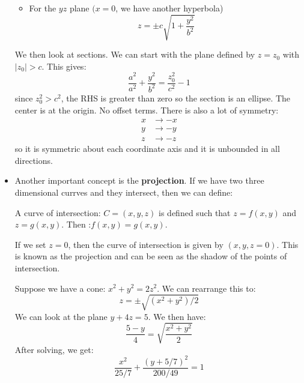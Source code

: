\begin{itemize}
\begin{example}
\begin{itemize}
            \item For the $yz$ plane $(x=0$, we have another hyperbola)
            \begin{equation}
                z = \pm c\sqrt{1+\frac{y^2}{b^2}}
            \end{equation}
        \end{itemize}
        We then look at sections. We can start with the plane defined by $z=z_0$ with $|z_0|>c$. This gives:
        \begin{equation}
            \frac{a^2}{a^2}+\frac{y^2}{b^2}=\frac{z_0^2}{c^2}-1
        \end{equation}
        since $z_0^2>c^2$, the RHS is greater than zero so the section is an ellipse. The center is at the origin. No offset terms. There is also a lot of symmetry:
        \begin{align}
            x &\to -x \\ 
            y &\to -y \\ 
            z &\to -z
        \end{align}
        so it is symmetric about each coordinate axis and it is unbounded in all directions.
    \end{example}
    \item Another important concept is the \textbf{projection}. If we have two three dimensional currves and they intersect, then we can define:
    \begin{definition}
        A curve of intersection: $C=(x,y,z)$ is defined such that $z=f(x,y)$ and $z=g(x,y)$. Then :$f(x,y)=g(x,y)$.
    \end{definition}
    If we set $z=0$, then the curve of intersection is given by $(x,y,z=0)$. This is known as the projection and can be seen as the shadow of the points of intersection.
    \begin{example}
        Suppose we have a cone: $x^2+y^2=2z^2$. We can rearrange this to:
        \begin{equation}
            z=\pm\sqrt{(x^2+y^2)/2}
        \end{equation}
        We can look at the plane $y+4z=5$. We then have:
        \begin{equation}
            \frac{5-y}{4}=\sqrt{\frac{x^2+y^2}{2}}
        \end{equation}
        After solving, we get:
        \begin{equation}
            \frac{x^2}{25/7} + \frac{(y+5/7)^2}{200/49} = 1
        \end{equation}

\end{example}
\end{itemize}
